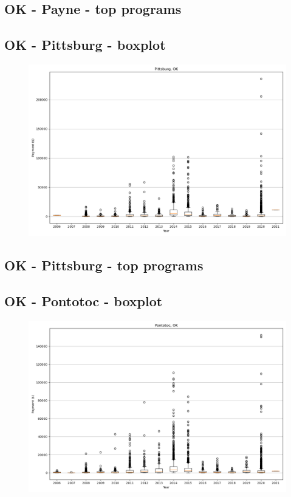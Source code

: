 \subsection*{OK - Payne - top programs}

\newpage
\subsection*{OK - Pittsburg - boxplot}
\begin{figure}[h]
\centering
\includegraphics[width=7in]{../output/boxplots/counties/Pittsburg-OK_boxplot.png}
\end{figure}


\subsection*{OK - Pittsburg - top programs}

\newpage
\subsection*{OK - Pontotoc - boxplot}
\begin{figure}[h]
\centering
\includegraphics[width=7in]{../output/boxplots/counties/Pontotoc-OK_boxplot.png}
\end{figure}


